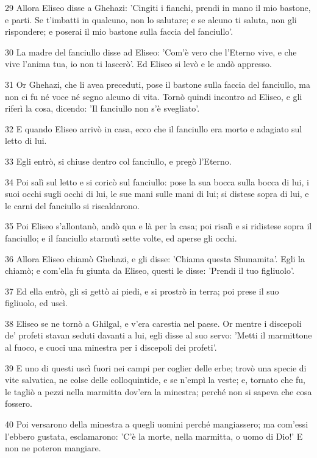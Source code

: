 \par 29 Allora Eliseo disse a Ghehazi: 'Cingiti i fianchi, prendi in mano il mio bastone, e parti. Se t'imbatti in qualcuno, non lo salutare; e se alcuno ti saluta, non gli rispondere; e poserai il mio bastone sulla faccia del fanciullo'.
\par 30 La madre del fanciullo disse ad Eliseo: 'Com'è vero che l'Eterno vive, e che vive l'anima tua, io non ti lascerò'. Ed Eliseo si levò e le andò appresso.
\par 31 Or Ghehazi, che li avea preceduti, pose il bastone sulla faccia del fanciullo, ma non ci fu né voce né segno alcuno di vita. Tornò quindi incontro ad Eliseo, e gli riferì la cosa, dicendo: 'Il fanciullo non s'è svegliato'.
\par 32 E quando Eliseo arrivò in casa, ecco che il fanciullo era morto e adagiato sul letto di lui.
\par 33 Egli entrò, si chiuse dentro col fanciullo, e pregò l'Eterno.
\par 34 Poi salì sul letto e si coricò sul fanciullo: pose la sua bocca sulla bocca di lui, i suoi occhi sugli occhi di lui, le sue mani sulle mani di lui; si distese sopra di lui, e le carni del fanciullo si riscaldarono.
\par 35 Poi Eliseo s'allontanò, andò qua e là per la casa; poi risalì e si ridistese sopra il fanciullo; e il fanciullo starnutì sette volte, ed aperse gli occhi.
\par 36 Allora Eliseo chiamò Ghehazi, e gli disse: 'Chiama questa Shunamita'. Egli la chiamò; e com'ella fu giunta da Eliseo, questi le disse: 'Prendi il tuo figliuolo'.
\par 37 Ed ella entrò, gli si gettò ai piedi, e si prostrò in terra; poi prese il suo figliuolo, ed uscì.
\par 38 Eliseo se ne tornò a Ghilgal, e v'era carestia nel paese. Or mentre i discepoli de' profeti stavan seduti davanti a lui, egli disse al suo servo: 'Metti il marmittone al fuoco, e cuoci una minestra per i discepoli dei profeti'.
\par 39 E uno di questi uscì fuori nei campi per coglier delle erbe; trovò una specie di vite salvatica, ne colse delle colloquintide, e se n'empì la veste; e, tornato che fu, le tagliò a pezzi nella marmitta dov'era la minestra; perché non si sapeva che cosa fossero.
\par 40 Poi versarono della minestra a quegli uomini perché mangiassero; ma com'essi l'ebbero gustata, esclamarono: 'C'è la morte, nella marmitta, o uomo di Dio!' E non ne poteron mangiare.
